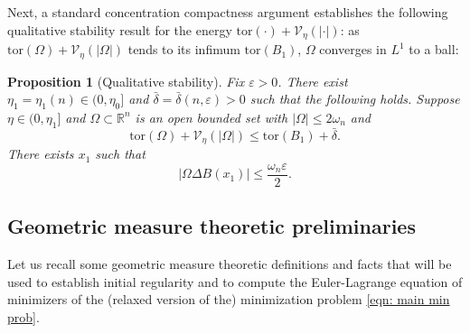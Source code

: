 \documentclass[10pt, reqno]{amsart}
\numberwithin{equation}{section}
\newtheorem{proposition}[theorem]{Proposition}
\def\R{{\mathbb R}}
\def\e{\varepsilon}
\def\W{\Omega}
\def\tor{\mathrm{tor}}
\def\vpar{\eta}
\def\fv{\mathscr{V}_{\vpar}}
\def\ccdel{\bar{\delta}}
\begin{document}
Next, a standard concentration compactness argument establishes the following qualitative stability result for the energy $\tor(\cdot) +  \mathscr{V}_\eta(|\cdot|)$: as $\tor(\W) +  \mathscr{V}_\eta(|\W|)$ tends to its infimum $\tor(B_1)$, $\Omega$ converges in $L^1$ to a ball:
 \begin{proposition}[Qualitative stability]
 	\label{lemma: qual stability}
 	Fix $\e>0$. There exist $\eta_1={\eta}_1(n)\in (0,\eta_0]$ and $\ccdel = \ccdel(n,\e)>0$ such that the following holds. Suppose  $\eta \in (0, \eta_1]$ and $\W\subset\R^n$ is an open bounded set with $|\W|\leq 2\omega_n$ and 
 	\begin{equation}
 		\label{eqn: small base energy}
 	\tor(\W) +\fv(|\W|) \leq \tor(B_1) + \ccdel.
 	 	\end{equation}
 	There exists $x_1$ such that
 	\begin{equation}
 		\label{eqn: qual stab}
 	|\W \Delta B(x_1) | \leq \frac{\omega_n\e}{2}.
 		\end{equation}
 \end{proposition}



%

\subsection{Geometric measure theoretic preliminaries} Let us recall some geometric measure theoretic definitions and facts that will be used to establish initial regularity and to compute the Euler-Lagrange equation of minimizers of the (relaxed version of the) minimization problem \eqref{eqn: main min prob}.
\end{document}
